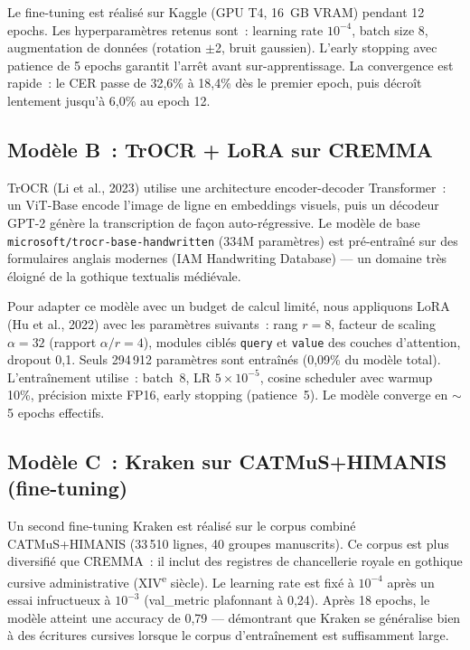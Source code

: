 \documentclass[11pt,a4paper]{article}
\begin{document}
Le fine-tuning est réalisé sur Kaggle (GPU T4, 16~GB VRAM) pendant 12 epochs. Les hyperparamètres retenus sont~: learning rate $10^{-4}$, batch size 8, augmentation de données (rotation $\pm$2\textdegree, bruit gaussien). L'early stopping avec patience de 5 epochs garantit l'arrêt avant sur-apprentissage. La convergence est rapide~: le CER passe de 32,6\% à 18,4\% dès le premier epoch, puis décroît lentement jusqu'à 6,0\% au epoch 12.

\subsection{Modèle B~: TrOCR + LoRA sur CREMMA}

TrOCR (Li et al., 2023) utilise une architecture encoder-decoder Transformer~: un ViT-Base encode l'image de ligne en embeddings visuels, puis un décodeur GPT-2 génère la transcription de façon auto-régressive. Le modèle de base \texttt{microsoft/trocr-base-handwritten} (334M paramètres) est pré-entraîné sur des formulaires anglais modernes (IAM Handwriting Database) --- un domaine très éloigné de la gothique textualis médiévale.

Pour adapter ce modèle avec un budget de calcul limité, nous appliquons LoRA (Hu et al., 2022) avec les paramètres suivants~: rang $r=8$, facteur de scaling $\alpha=32$ (rapport $\alpha/r = 4$), modules ciblés \texttt{query} et \texttt{value} des couches d'attention, dropout 0,1. Seuls 294\,912 paramètres sont entraînés (0,09\% du modèle total). L'entraînement utilise~: batch~8, LR $5\times10^{-5}$, cosine scheduler avec warmup 10\%, précision mixte FP16, early stopping (patience~5). Le modèle converge en $\sim$5 epochs effectifs.

\subsection{Modèle C~: Kraken sur CATMuS+HIMANIS (fine-tuning)}

Un second fine-tuning Kraken est réalisé sur le corpus combiné CATMuS+HIMANIS (33\,510 lignes, 40 groupes manuscrits). Ce corpus est plus diversifié que CREMMA~: il inclut des registres de chancellerie royale en gothique cursive administrative (XIV\textsuperscript{e} siècle). Le learning rate est fixé à $10^{-4}$ après un essai infructueux à $10^{-3}$ (val\_metric plafonnant à 0,24). Après 18 epochs, le modèle atteint une accuracy de 0,79 --- démontrant que Kraken se généralise bien à des écritures cursives lorsque le corpus d'entraînement est suffisamment large.
\end{document}
